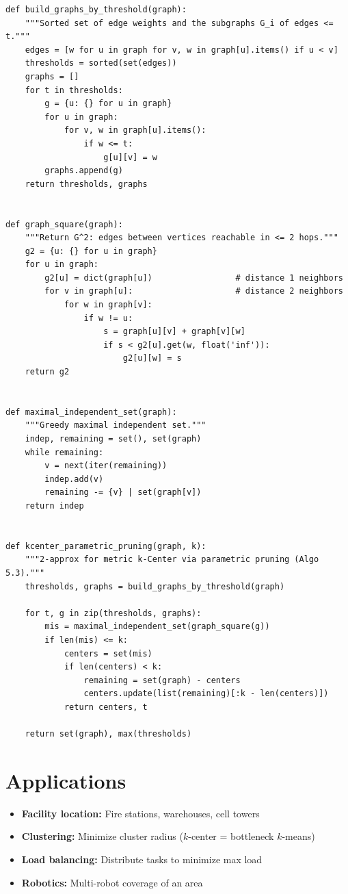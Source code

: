 \begin{lstlisting}[style=python, caption=k-Center Parametric Pruning]
def build_graphs_by_threshold(graph):
    """Sorted set of edge weights and the subgraphs G_i of edges <= t."""
    edges = [w for u in graph for v, w in graph[u].items() if u < v]
    thresholds = sorted(set(edges))
    graphs = []
    for t in thresholds:
        g = {u: {} for u in graph}
        for u in graph:
            for v, w in graph[u].items():
                if w <= t:
                    g[u][v] = w
        graphs.append(g)
    return thresholds, graphs


def graph_square(graph):
    """Return G^2: edges between vertices reachable in <= 2 hops."""
    g2 = {u: {} for u in graph}
    for u in graph:
        g2[u] = dict(graph[u])                 # distance 1 neighbors
        for v in graph[u]:                     # distance 2 neighbors
            for w in graph[v]:
                if w != u:
                    s = graph[u][v] + graph[v][w]
                    if s < g2[u].get(w, float('inf')):
                        g2[u][w] = s
    return g2


def maximal_independent_set(graph):
    """Greedy maximal independent set."""
    indep, remaining = set(), set(graph)
    while remaining:
        v = next(iter(remaining))
        indep.add(v)
        remaining -= {v} | set(graph[v])
    return indep


def kcenter_parametric_pruning(graph, k):
    """2-approx for metric k-Center via parametric pruning (Algo 5.3)."""
    thresholds, graphs = build_graphs_by_threshold(graph)

    for t, g in zip(thresholds, graphs):
        mis = maximal_independent_set(graph_square(g))
        if len(mis) <= k:
            centers = set(mis)
            if len(centers) < k:
                remaining = set(graph) - centers
                centers.update(list(remaining)[:k - len(centers)])
            return centers, t

    return set(graph), max(thresholds)
\end{lstlisting}

\section{Applications}
\begin{itemize}
    \item \textbf{Facility location:} Fire stations, warehouses, cell towers
    \item \textbf{Clustering:} Minimize cluster radius ($k$-center = bottleneck $k$-means)
    \item \textbf{Load balancing:} Distribute tasks to minimize max load
    \item \textbf{Robotics:} Multi-robot coverage of an area
\end{itemize}

